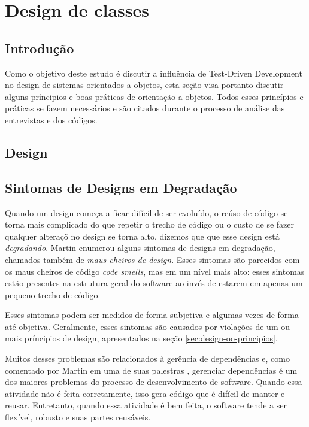 \chapter{Design de classes}
\label{cap:design}

\section{Introdução}
\label{sec:design-introducao}

Como o objetivo deste estudo é discutir a influência de Test-Driven Development no design de sistemas orientados a objetos, esta
seção visa portanto discutir alguns príncipios e boas práticas de orientação a objetos.
Todos esses princípios e práticas se fazem necessários e são citados durante o processo de análise das entrevistas
e dos códigos.

\section{Design}


\section{Sintomas de Designs em Degradação}

Quando um design começa a ficar difícil de ser evoluído, o reúso de código se torna mais complicado do que repetir o trecho de código ou 
o custo de se fazer qualquer alteraçõ no design se torna alto, dizemos que que esse design está \textit{degradando}. 
Martin \cite{bob-martin} enumerou alguns sintomas de designs em degradação, chamados também de \textit{maus cheiros de design}. 
Esses sintomas são parecidos com os maus cheiros de código \textit{code smells}, mas em um nível mais alto: esses sintomas
estão presentes na estrutura geral do software ao invés de estarem em apenas um pequeno trecho de código.

Esses sintomas podem ser medidos de forma subjetiva e algumas vezes de forma até objetiva. Geralmente, esses sintomas são causados
por violações de um ou mais príncipios de design, apresentados na seção \ref{sec:design-oo-principios}. 

Muitos desses problemas são relacionados à gerência de dependências e, como comentado por Martin em
uma de suas palestras \cite{bobmartin-infoq}, gerenciar dependências é um dos maiores problemas do processo de desenvolvimento de software.
Quando essa atividade não é feita corretamente, isso gera código que é difícil de manter e reusar. Entretanto, quando essa atividade
é bem feita, o software tende a ser flexível, robusto e suas partes reusáveis.

